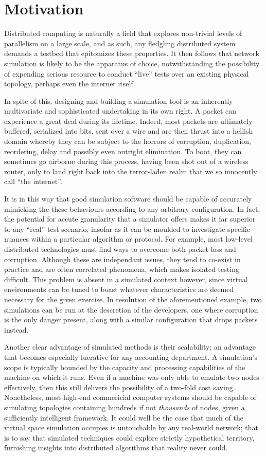 \section{Motivation}

Distributed computing is naturally a field that explores non-trivial levels of parallelism on a large scale, and as
such, any fledgling distributed system demands a testbed that epitomizes these properties. It then follows that
network simulation is likely to be the apparatus of choice, notwithstanding the possibility of expending serious
resource to conduct ``live'' tests over an existing physical topology, perhaps even the internet itself.

In spite of this, designing and building a simulation tool is an inherently multivariate and sophisticated undertaking
in its own right. A packet can experience a great deal during its lifetime. Indeed, most packets are ultimately
buffered, serialized into bits, sent over a wire and are then thrust into a hellish domain whereby they can be
subject to the horrors of corruption, duplication, reordering, delay and possibly even outright elimination. To boot,
they can sometimes go airborne during this process, having been shot out of a wireless router, only to land right
back into the terror-laden realm that we so innocently call ``the internet''.

It is in this way that good simulation software should be capable of accurately mimicking the these behaviours
according to any arbitrary configuration. In fact, the potential for accute granularity that a simulator offers makes
it far superior to any ``real'' test scenario, insofar as it can be moulded to investigate specific nuances within a
particular algorithm or protocol. For example, most low-level distributed technologies must find ways to overcome
both packet loss and corruption. Although these are independant issues, they tend to co-exist in practice and are
often correlated phenomena, which makes isolated testing difficult. This problem is absent in a simulated context
however, since virtual environments can be tuned to boast whatever characteristics are deemed necessary for
the given exercise. In resolution of the aforementioned example, two simulations can be run at the descretion of the
developers, one where corruption is the only danger present, along with a similar configuration that drops packets
instead.

Another clear advantage of simulated methods is their scalability; an advantage that becomes especially lucrative for
any accounting department. A simulation's scope is typically bounded by the capacity and processing capabilities of
the machine on which it runs. Even if a machine was only able to emulate two nodes effectively, then this still
delivers the possibility of a two-fold cost saving. Nonetheless, most high-end commericial computer systems should be
capable of simulating topologies containing hundreds if not \emph{thousands} of nodes, given a sufficiently
intelligent framework. It could well be the case that much of the virtual space simulation occupies is untouchable by
any real-world network; that is to say that simulated techniques could explore strictly hypothetical territory,
furnishing insights into distributed algorithms that reality never could.


